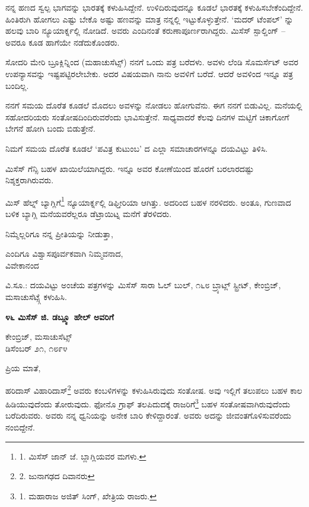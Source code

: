 ನನ್ನ ಹಣದ ಸ್ವಲ್ಪ ಭಾಗವನ್ನು ಭಾರತಕ್ಕೆ ಕಳುಹಿಸಿದ್ದೇನೆ. ಉಳಿದಿರುವುದನ್ನೂ ಕೂಡಲೆ ಭಾರತಕ್ಕೆ ಕಳುಹಿಸಬೇಕೆಂದಿದ್ದೇನೆ. ಹಿಂತಿರುಗಿ ಹೋಗಲು ಎಷ್ಟು ಬೇಕೊ ಅಷ್ಟು ಹಣವನ್ನು ಮಾತ್ರ ನನ್ನಲ್ಲಿ ಇಟ್ಟುಕೊಳ್ಳುತ್ತೇನೆ. ‘ಮದರ್ ಟೆಂಪಲ್’ ನ್ನು ಹಲವು ಬಾರಿ ನ್ಯೂಯಾರ್ಕ್ನಲ್ಲಿ ನೋಡಿದೆ. ಅವರು ಎಂದಿನಂತೆ ಕರುಣಾಪೂರ್ಣರಾಗಿದ್ದರು. ಮಿಸೆಸ್ ಸ್ಪಾಲ್ಡಿಂಗ್ – ಅವರೂ ಕೂಡ ಹಾಗೆಯೇ ನಡೆದುಕೊಂಡರು.

ಸೋದರಿ ಮೇರಿ ಬ್ರೂಕ್ಲಿನ್ನಿಂದ (ಮಹಾಚುಸೆಟ್ಸ್) ನನಗೆ ಒಂದು ಪತ್ರ ಬರೆದಳು. ಅವಳು ಲೆಂಡಿ ಸೊಮರ್ಸೆಟ್ ಅವರ ಉಪನ್ಯಾಸವನ್ನು ಇಷ್ಟಪಟ್ಟಿರಲೇಬೇಕು. ಅದರ ವಿಷಯವಾಗಿ ನಾನು ಅವಳಿಗೆ ಬರೆದೆ. ಆದರೆ ಅವಳಿಂದ ಇನ್ನೂ ಪತ್ರ ಬಂದಿಲ್ಲ.

ನನಗೆ ಸಮಯ ದೊರೆತ ಕೂಡಲೆ ಮೊದಲು ಅವಳನ್ನು ನೋಡಲು ಹೋಗುವೆನು. ಈಗ ನನಗೆ ಬಿಡುವಿಲ್ಲ. ಮನೆಯಲ್ಲಿ ಸಹೋದರಿಯರು ಸಂತೋಷದಿಂದಿರುವರೆಂದು ಭಾವಿಸುತ್ತೇನೆ. ಸಾಧ್ಯವಾದರೆ ಕೆಲವು ದಿನಗಳ ಮಟ್ಟಿಗೆ ಚಿಕಾಗೋಗೆ ಬೇಗನೆ ಹೋಗಿ ಬಂದು ಬಿಡುತ್ತೇನೆ.

ನಿಮಗೆ ಸಮಯ ದೊರೆತ ಕೂಡಲೆ ‘ಪವಿತ್ರ ಕುಟುಂಬ’ ದ ಎಲ್ಲಾ ಸಮಾಚಾರಗಳನ್ನೂ ದಯವಿಟ್ಟು ತಿಳಿಸಿ.

ಮಿಸೆಸ್ ಗೆನ್ಸಿ ಬಹಳ ಖಾಯಿಲೆಯಾಗಿದ್ದರು. ಇನ್ನೂ ಅವರ ಕೋಣೆಯಿಂದ ಹೊರಗೆ ಬರಲಾರದಷ್ಟು ನಿಶ್ಶಕ್ತರಾಗಿರುವರು.

ಮಿಸ್ ಹೆಲ್ನ್ ಬ್ಯಾಗ್ಲಿಗೆ\footnote{1. ಮಿಸೆಸ್ ಜಾನ್ ಜೆ. ಬ್ಲಾಗ್ಲಿಯವರ ಮಗಳು.} ನ್ಯೂಯಾರ್ಕ್ನಲ್ಲಿ ಡಿಫ್ತೀರಿಯಾ ಆಗಿತ್ತು. ಅದರಿಂದ ಬಹಳ ನರಳಿದರು. ಅಂತೂ, ಗುಣವಾದ ಬಳಿಕ ಬ್ಯಾಗ್ಲಿ ಮನೆಯವರೆಲ್ಲರೂ ಡೆಟ್ರಾಯಿಟ್ನ ಮನೆಗೆ ತೆರಳಿದರು.

ನಿಮ್ಮೆಲ್ಲರಿಗೂ ನನ್ನ ಪ್ರೀತಿಯನ್ನು ನೀಡುತ್ತಾ,

\begin{flushright}
ಎಂದಿಗೂ ವಿಶ್ವಾಸಪೂರ್ವಕವಾಗಿ ನಿಮ್ಮವನಾದ,\\ವಿವೇಕಾನಂದ
\end{flushright}

ವಿ.ಸೂ.: ದಯವಿಟ್ಟು ಅಂಚೆಯ ಪತ್ರಗಳನ್ನು  ಮಿಸೆಸ್ ಸಾರಾ ಓಲ್ ಬುಲ್, ೧೬೮ ಬ್ರ್ಯಾಟ್ಲ್ ಸ್ಟ್ರೀಟ್, ಕೇಂಬ್ರಿಜ್, ಮಸಾಚುಸೆಟ್ಸ್ಗೆ ಕಳುಹಿಸಿ.

\begin{center}
\textbf{೪೬ ಮಿಸೆಸ್ ಜಿ. ಡಬ್ಲ್ಯೂ ಹೇಲ್ ಅವರಿಗೆ}
\end{center}

\begin{flushright}
ಕೇಂಬ್ರಿಜ್, ಮಸಾಚುಸೆಟ್ಸ್\\ಡಿಸೆಂಬರ್ ೨೧, ೧೮೯೪
\end{flushright}

ಪ್ರಿಯ ಮಾತೆ,

ಹರಿದಾಸ್ ವಿಹಾರಿದಾಸ್\footnote{2. ಜುನಾಗಢದ ದಿವಾನರು} ಅವರು ಕಂಬಳಿಗಳನ್ನು ಕಳುಹಿಸಿರುವುದು ಸಂತೋಷ. ಅವು ಇಲ್ಲಿಗೆ ತಲುಪಲು ಬಹಳ ಕಾಲ ಹಿಡಿಯುವುದೆಂದು ತೋರುವುದು. ಫೋನೊ ಗ್ರಾಫ್ ತಲಪಿದುದಕ್ಕೆ ರಾಜರಿಗೆ\footnote{1. ಮಹಾರಾಜ ಅಜಿತ್ ಸಿಂಗ್, ಖೇತ್ರಿಯ ರಾಜರು.} ಬಹಳ ಸಂತೋಷವಾಗಿರುವುದೆಂದು ಬರೆದಿರುವರು. ಅವರು ನನ್ನ ಧ್ವನಿಯನ್ನು ಅನೇಕ ಬಾರಿ ಕೇಳಿದ್ದಾರಂತೆ. ಅವರು ಅದನ್ನು ಜೀವಂತಗೊಳಿಸುವರೆಂದು ನಂಬಿದ್ದೇನೆ.

